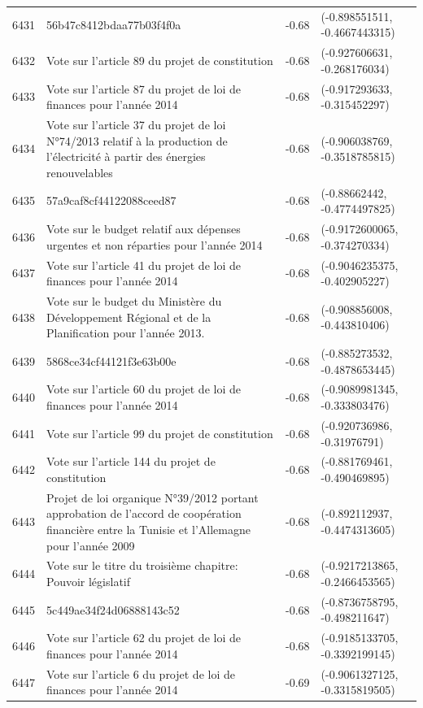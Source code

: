\begin{table}[ht]
\begin{tabular}{rlrl}
  6431 & 56b47c8412bdaa77b03f4f0a & -0.68 & (-0.898551511, -0.4667443315) \\ 
  6432 & Vote sur l'article 89 du projet de constitution & -0.68 & (-0.927606631, -0.268176034) \\ 
  6433 & Vote sur l'article 87 du projet de loi de finances pour l'année 2014 & -0.68 & (-0.917293633, -0.315452297) \\ 
  6434 & Vote sur l'article 37 du projet de loi N°74/2013 relatif à la production de l'électricité à partir des énergies renouvelables & -0.68 & (-0.906038769, -0.3518785815) \\ 
  6435 & 57a9caf8cf44122088ceed87 & -0.68 & (-0.88662442, -0.4774497825) \\ 
  6436 & Vote sur le budget relatif aux dépenses urgentes et non réparties pour l'année 2014 & -0.68 & (-0.9172600065, -0.374270334) \\ 
  6437 & Vote sur l'article 41 du projet de loi de finances pour l'année 2014 & -0.68 & (-0.9046235375, -0.402905227) \\ 
  6438 & Vote sur le budget du Ministère du Développement Régional et de la Planification pour l'année 2013. & -0.68 & (-0.908856008, -0.443810406) \\ 
  6439 & 5868ce34cf44121f3e63b00e & -0.68 & (-0.885273532, -0.4878653445) \\ 
  6440 & Vote sur l'article 60 du projet de loi de finances pour l'année 2014 & -0.68 & (-0.9089981345, -0.333803476) \\ 
  6441 & Vote sur l'article 99 du projet de constitution & -0.68 & (-0.920736986, -0.31976791) \\ 
  6442 & Vote sur l'article 144 du projet de constitution & -0.68 & (-0.881769461, -0.490469895) \\ 
  6443 & Projet de loi organique N°39/2012 portant approbation de l'accord de coopération financière entre la Tunisie et l'Allemagne pour l'année 2009 & -0.68 & (-0.892112937, -0.4474313605) \\ 
  6444 & Vote sur le titre du troisième chapitre: Pouvoir législatif & -0.68 & (-0.9217213865, -0.2466453565) \\ 
  6445 & 5c449ae34f24d06888143c52 & -0.68 & (-0.8736758795, -0.498211647) \\ 
  6446 & Vote sur l'article 62 du projet de loi de finances pour l'année 2014 & -0.68 & (-0.9185133705, -0.3392199145) \\ 
  6447 & Vote sur l'article 6 du projet de loi de finances pour l'année 2014 & -0.69 & (-0.9061327125, -0.3315819505) \\ 

\end{tabular}
\end{table}
